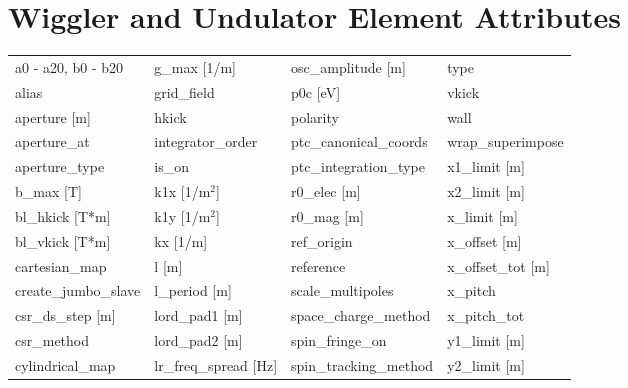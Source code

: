  \section{Wiggler and Undulator Element Attributes}
 \label{s:list.wiggler}
 
 \begin{tabular}{llll} \toprule
a0 - a20, b0 - b20               & g_max [1/m]                      & osc_amplitude [m]                & type                             \\
alias                            & grid_field                       & p0c [eV]                         & vkick                            \\
aperture [m]                     & hkick                            & polarity                         & wall                             \\
aperture_at                      & integrator_order                 & ptc_canonical_coords             & wrap_superimpose                 \\
aperture_type                    & is_on                            & ptc_integration_type             & x1_limit [m]                     \\
b_max [T]                        & k1x [1/m$^2$]                    & r0_elec [m]                      & x2_limit [m]                     \\
bl_hkick [T*m]                   & k1y [1/m$^2$]                    & r0_mag [m]                       & x_limit [m]                      \\
bl_vkick [T*m]                   & kx [1/m]                         & ref_origin                       & x_offset [m]                     \\
cartesian_map                    & l [m]                            & reference                        & x_offset_tot [m]                 \\
create_jumbo_slave               & l_period [m]                     & scale_multipoles                 & x_pitch                          \\
csr_ds_step [m]                  & lord_pad1 [m]                    & space_charge_method              & x_pitch_tot                      \\
csr_method                       & lord_pad2 [m]                    & spin_fringe_on                   & y1_limit [m]                     \\
cylindrical_map                  & lr_freq_spread [Hz]              & spin_tracking_method             & y2_limit [m]                     \\

\end{tabular}
